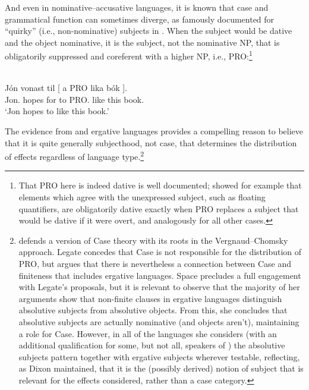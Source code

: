 \documentclass[output=paper]{langsci/langscibook}
\begin{document}
And even in nominative--accusative languages, it is known that case and
grammatical function can sometimes diverge, as famously documented for
\enquote{quirky} (i.e., non-nominative) subjects in 
\citep{andrews76,ZaenenEtAl1985,sigurdsson91}. When the subject would be dative
and the object nominative, it is the subject, not the nominative NP, that is
obligatorily suppressed and coreferent with a higher NP, i.e.,
PRO:\footnote{That PRO here is indeed dative is well documented;
    \citet{sigurdsson91} showed for example that elements which agree with the
unexpressed subject, such as floating quantifiers, are obligatorily dative
exactly when PRO replaces a subject that would be dative if it were overt, and
analogously for all other cases.}

\ea {} \citep[116]{jonsson96}\\
    \gll J\'on vonast til [ a{\dh} PRO lika  b\'ok ].\\
	Jon.\Nom{} hopes for {} to PRO.\Dat{} like this book.\Nom{} \\
	\glt `Jon hopes to like this book.'
\z

The evidence from  and ergative languages
provides a compelling reason to believe that it is quite generally subjecthood,
not case, that determines the distribution of  effects regardless
of language type.\footnote{\citet{Legate2008} defends a version of Case theory
    with its roots in the Vergnaud--Chomsky approach. Legate concedes that Case
    is not responsible for the distribution of PRO, but argues that there is
    nevertheless a connection between Case and finiteness that includes
    ergative languages. Space precludes a full engagement with Legate's
    proposals, but it is relevant to observe that the majority of her arguments
    show that non-finite clauses in ergative languages distinguish absolutive
    subjects from absolutive objects. From this, she concludes that absolutive
    subjects are actually nominative (and objects aren't),
    maintaining a role for Case. However, in all of the languages she considers
    (with an additional qualification for some, but not all, speakers of
    ) the absolutive subjects pattern together with ergative
    subjects wherever testable, reflecting, as Dixon maintained, that it is the
    (possibly derived) notion of subject that is relevant for the effects
considered, rather than a case category.}
\end{document}
